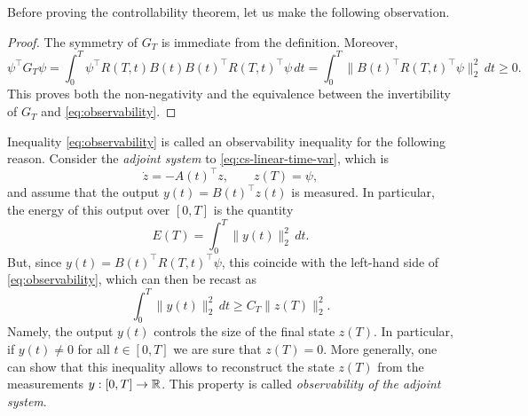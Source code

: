 Before proving the controllability theorem, let us make the following observation.


\begin{proof}
    The symmetry of $G_T$ is immediate from the definition. Moreover,
    \begin{equation}
        \psi^\top G_T \psi = \int_0^T \psi^\top R(T,t)B(t) B(t)^\top R(T,t)^\top \psi\, dt = \int_0^T \|B(t)^\top R(T,t)^\top \psi\|_2^2 \, dt \ge 0.
    \end{equation}
    This proves both the non-negativity and the equivalence between the invertibility of $G_T$ and \eqref{eq:observability}.
\end{proof}

\begin{remark}
    Inequality \eqref{eq:observability} is called an observability inequality for the following reason. Consider the \emph{adjoint system} to \eqref{eq:cs-linear-time-var}, which is
    \begin{equation}
        \dot z = -A(t)^\top  z, \qquad z(T) = \psi,
    \end{equation}
    and assume that the output $y(t) = B(t)^\top z(t)$ is measured.
    In particular, the energy of this output over $[0,T]$ is the quantity
    \begin{equation}
        E(T) = \int_0^T \|y(t)\|_2^2\, dt.
    \end{equation}
    But, since $y(t) = B(t)^\top R(T,t)^\top \psi$, this coincide with the left-hand side of \eqref{eq:observability}, which can then be recast as
    \begin{equation}
        \int_0^T \|y(t)\|_2^2 \, dt \ge C_T \|z(T)\|_2^2.
    \end{equation}
    Namely, the output $y(t)$ controls the size of the final state $z(T)$.
    In particular, if $y(t)\neq 0$ for all $t\in [0,T]$ we are sure that $z(T)=0$.
    More generally, one can show that this inequality allows to reconstruct the state $z(T)$ from the measurements $y:[0,T]\to \mathbb{R}$.
% 
    This property is called \emph{observability of the adjoint system}. 
\end{remark}

